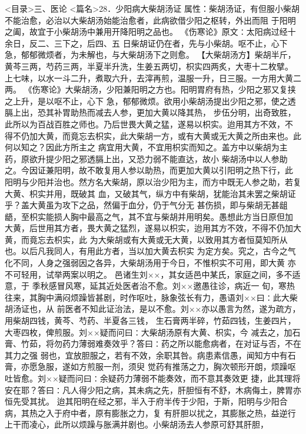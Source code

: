 \documentclass[a4paper,12pt,UTF8,twoside]{ctexbook}
\begin{document}
<目录>三、医论
<篇名>28．少阳病大柴胡汤证
属性：柴胡汤证，有但服小柴胡不能治愈，必治以大柴胡汤始能治愈者，此病欲借少阳之枢转，外出而阻 
于阳明之阖，故宜于小柴胡汤中兼用开降阳明之品也。 
《伤寒论》原文∶太阳病过经十余日，反二、三下之，后四、五 
日柴胡证仍在者，先与小柴胡。呕不止，心下急，郁郁微烦者，为未解也，与大柴胡汤下之则愈。 
【大柴胡汤方】柴胡半斤，黄芩三两，芍药三两，半夏半升洗，生姜五两切，枳实四两炙，大枣十二枚擘。 
上七味，以水一斗二升，煮取六升，去滓再煎，温服一升，日三服。一方用大黄二两。 
《伤寒论》大柴胡汤，少阳兼阳明之方也。阳明胃府有热，少阳之邪又复挟之上升，是以呕不止，心下 
急，郁郁微烦。欲用小柴胡汤提出少阳之邪，使之透膈上出，恐其补胃助热而减去人参，更加大黄以降其热， 
步伍分明，出奇致胜，此所以为百战百胜之师也。乃后世畏大黄之猛，遂易以枳实。迨用其方不效，不 
得不仍加大黄，而竟忘去枳实，此大柴胡一方，或有大黄或无大黄之所由来也。此何以知之？因此方所主之 
病宜用大黄，不宜用枳实而知之。盖方中以柴胡为主药，原欲升提少阳之邪透膈上出，又恐力弱不能直达，故小 
柴胡汤中以人参助之。今因证兼阳明，故不敢复用人参以助热，而更加大黄以引阳明之热下行，此 
阳明与少阳并治也。然方名大柴胡，原以治少阳为主，而方中既无人参之助，若复大黄、枳实并用，既破其 
血，又破其气，纵方中有柴胡，犹能治其未罢之柴胡证乎？盖大黄虽为攻下之品，然偏于血分，仍于气分无 
甚伤损，即与柴胡无甚龃龉，至枳实能损人胸中最高之气，其不宜与柴胡并用明矣。愚想此方当日原但加 
大黄，后世用其方者，畏大黄之猛烈，遂易以枳实，迨用其方不效，不得不仍加大黄，而竟忘去枳实，此 
为大柴胡或有大黄或无大黄，以致用其方者恒莫知所从也。以后凡我同人，有用此方者，当以加大黄去枳实 
为定方矣。究之，古今之气化不同，人身之强弱因之各异，大柴胡汤用于今日，不惟枳实不可用，即大黄 
亦不可轻用，试举两案以明之。 
邑诸生刘××，其女适邑中某氏，家庭之间，多不适意，于 
季秋感冒风寒，延其近处医者治不愈。刘××邀愚往诊，病近一 
旬，寒热往来，其胸中满闷烦躁皆甚剧，时作呕吐，脉象弦长有力，愚语刘××曰∶此大柴胡汤证也，从 
前医者不知此证治法，是以不愈。刘××亦以愚言为然，遂为疏方，用柴胡四钱，黄芩、芍药、半夏各三钱， 
生石膏两半碎，竹茹四钱，生姜四片，大枣四枚，俾煎服。刘××疑而问曰∶大柴胡汤原有大黄、枳实，今 
减去之，加石膏、竹茹，将勿药力薄弱难奏效乎？答曰∶药之所以能愈病者，在对证与否，不在其力之强 
弱也，宜放胆服之，若有不效，余职其咎。病患素信愚，闻知方中有石膏，亦愿急服，遂如方煎服一剂，须臾 
觉药有推荡之力，胸次顿形开朗，烦躁呕吐皆愈。刘××疑而问曰∶余疑药力薄弱不能奏效，而不意其奏效更 
捷，此其理将安在耶？答曰∶凡人得少阳之病，其未病之先，肝胆恒有不舒，木病侮土，脾胃亦恒先受其扰。 
迨其阳明在经之邪，半入于府半传于少阳，于斯，阳明与少阳合病，其热之入于府中者，原有膨胀之力，复 
有肝胆以扰之，其膨胀之热，益逆行上干而凌心，此所以烦躁与胀满并剧也。小柴胡汤去人参原可舒其肝胆， 
\end{document}

